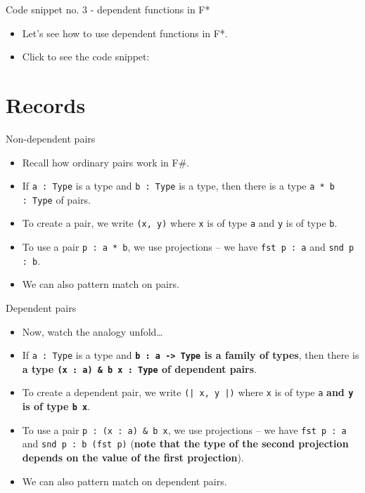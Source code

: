 \documentclass{beamer}
\newcommand{\m}[1]{\texttt{#1}}
\begin{document}
\begin{frame}{Code snippet no. 3 - dependent functions in F*}
\begin{itemize}
	\item Let's see how to use dependent functions in F*.
	\item Click to see the code snippet: \href{https://github.com/wkolowski/Dependent-Types-and-Theorem-Proving/blob/master/Code/DependentFunctions.fst}{\color{blue}{Code/DependentFunctions.fst}}
\end{itemize}
\end{frame}

\section{Records}

\begin{frame}{Non-dependent pairs}
\begin{itemize}
	\item Recall how ordinary pairs work in F\#.
	\item If \m{a :\ Type} is a type and \m{b :\ Type} is a type, then there is a type \m{a * b :\ Type} of pairs.
	\item To create a pair, we write \m{(x, y)} where \m{x} is of type \m{a} and \m{y} is of type \m{b}.
	\item To use a pair \m{p :\ a * b}, we use projections -- we have \m{fst p :\ a} and \m{snd p :\ b}.
	\item We can also pattern match on pairs.
\end{itemize}
\end{frame}

\begin{frame}{Dependent pairs}
\begin{itemize}
	\item Now, watch the analogy unfold\dots
	\item If \m{a :\ Type} is a type and \textbf{\m{b :\ a -> Type} is a family of types}, then there is \textbf{a type \m{(x :\ a) \& b x :\ Type} of dependent pairs}.
	\item To create a dependent pair, we write \m{(| x, y |)} where \m{x} is of type \m{a} \textbf{and \m{y} is of type \m{b x}}.
	\item To use a pair \m{p :\ (x :\ a) \& b x}, we use projections -- we have \m{fst p :\ a} and \m{snd p :\ b (fst p)} (\textbf{note that the type of the second projection depends on the value of the first projection}).
	\item We can also pattern match on dependent pairs.
\end{itemize}
\end{frame}
\end{document}
